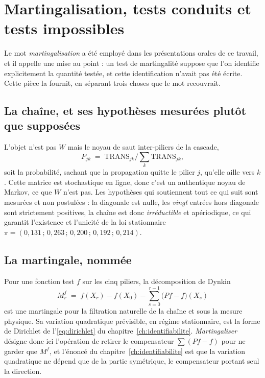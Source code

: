 \section{Martingalisation, tests conduits et tests impossibles}
\label{sec:ann-martingalisation}


Le mot \emph{martingalisation} a été employé dans les présentations orales de ce travail, et il
appelle une mise au point : un test de martingalité suppose que l'on identifie explicitement la
quantité testée, et cette identification n'avait pas été écrite. Cette pièce la fournit, en
séparant trois choses que le mot recouvrait.

\subsection*{La chaîne, et ses hypothèses mesurées plutôt que supposées}

L'objet n'est pas $W$ mais le noyau de saut inter-piliers de la cascade,
\[
  P_{jk} \;=\; \mathrm{TRANS}_{jk} \Big/ \sum_{k}\mathrm{TRANS}_{jk},
\]
soit la probabilité, sachant que la propagation quitte le pilier $j$, qu'elle aille vers $k$. Cette matrice est stochastique en
ligne, donc c'est un authentique noyau de Markov, ce que $W$ n'est pas. Les hypothèses qui
soutiennent tout ce qui suit sont mesurées et non postulées : la diagonale est nulle, les
\emph{vingt} entrées hors diagonale sont strictement positives, la chaîne est donc
\emph{irréductible} et apériodique, ce qui garantit l'existence et l'unicité de la loi
stationnaire $\pi = (0{,}131\,;\,0{,}263\,;\,0{,}200\,;\,0{,}192\,;\,0{,}214)$.

\subsection*{La martingale, nommée}

Pour une fonction test $f$ sur les cinq piliers, la décomposition de Dynkin
\begin{equation}
  M^f_r \;=\; f(X_r) - f(X_0) - \sum_{s=0}^{r-1}\bigl(Pf - f\bigr)(X_s)
  \label{eq:dynkin}
\end{equation}
est une martingale pour la filtration naturelle de la chaîne et sous la mesure
physique. Sa variation quadratique prévisible, en régime stationnaire, est la forme de Dirichlet
de l'\eqref{eq:dirichlet} du chapitre~\ref{ch:identifiabilite}. \emph{Martingaliser} désigne donc ici l'opération de
retirer le compensateur $\sum(Pf-f)$ pour ne garder que $M^f$, et l'énoncé du
chapitre~\ref{ch:identifiabilite} est que la variation quadratique ne dépend que de la partie
symétrique, le compensateur portant seul la direction.

